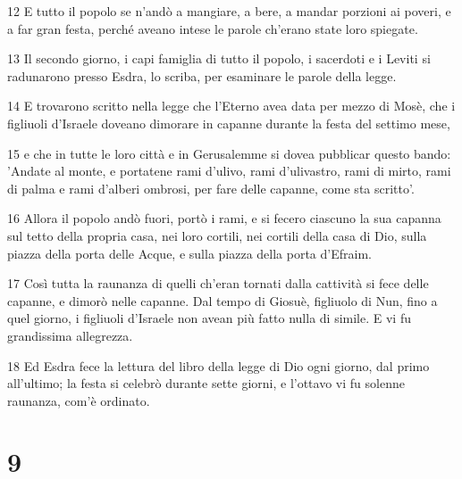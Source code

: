 \par 12 E tutto il popolo se n'andò a mangiare, a bere, a mandar porzioni ai poveri, e a far gran festa, perché aveano intese le parole ch'erano state loro spiegate.
\par 13 Il secondo giorno, i capi famiglia di tutto il popolo, i sacerdoti e i Leviti si radunarono presso Esdra, lo scriba, per esaminare le parole della legge.
\par 14 E trovarono scritto nella legge che l'Eterno avea data per mezzo di Mosè, che i figliuoli d'Israele doveano dimorare in capanne durante la festa del settimo mese,
\par 15 e che in tutte le loro città e in Gerusalemme si dovea pubblicar questo bando: 'Andate al monte, e portatene rami d'ulivo, rami d'ulivastro, rami di mirto, rami di palma e rami d'alberi ombrosi, per fare delle capanne, come sta scritto'.
\par 16 Allora il popolo andò fuori, portò i rami, e si fecero ciascuno la sua capanna sul tetto della propria casa, nei loro cortili, nei cortili della casa di Dio, sulla piazza della porta delle Acque, e sulla piazza della porta d'Efraim.
\par 17 Così tutta la raunanza di quelli ch'eran tornati dalla cattività si fece delle capanne, e dimorò nelle capanne. Dal tempo di Giosuè, figliuolo di Nun, fino a quel giorno, i figliuoli d'Israele non avean più fatto nulla di simile. E vi fu grandissima allegrezza.
\par 18 Ed Esdra fece la lettura del libro della legge di Dio ogni giorno, dal primo all'ultimo; la festa si celebrò durante sette giorni, e l'ottavo vi fu solenne raunanza, com'è ordinato.

\chapter{9}

